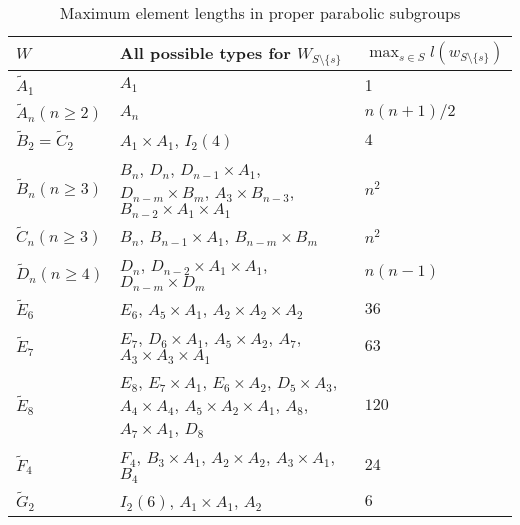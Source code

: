 \begin{table}[ht]
	\centering
	\begin{tabular}{l|p{7cm}|l}
		$W$ & All possible types for $W_{S \setminus \{s\}}$ & $\max_{s \in S} l(w_{S \setminus \{s\}})$ \\
		\hline
		$\tilde A_1$ & $A_1$ & 1 \\
		$\tilde A_n (n \geq 2)$ & $A_n$ & $n(n+1)/2$ \\
		$\tilde B_2 = \tilde C_2$ & $A_1 \times A_1$, $I_2(4)$ & $4$ \\
		$\tilde B_n (n \geq 3)$ & $B_n$, $D_n$, $D_{n-1} \times A_1$, $D_{n-m} \times B_m$, $A_3 \times B_{n-3}$, $B_{n-2} \times A_1 \times A_1$ & $n^2$ \\
		$\tilde C_n (n \geq 3)$ & $B_n$, $B_{n-1} \times A_1$, $B_{n-m} \times B_m$ & $n^2$ \\
		$\tilde D_n (n \geq 4)$ & $D_n$, $D_{n-2} \times A_1 \times A_1$, $D_{n-m} \times D_m$ & $n(n-1)$ \\
		$\tilde E_6$ & $E_6$, $A_5 \times A_1$, $A_2 \times A_2 \times A_2$ & $36$ \\
		$\tilde E_7$ & $E_7$, $D_6 \times A_1$, $A_5 \times A_2$, $A_7$, $A_3 \times A_3 \times A_1$ & $63$ \\
		$\tilde E_8$ & $E_8$, $E_7 \times A_1$, $E_6 \times A_2$, $D_5 \times A_3$, $A_4 \times A_4$, $A_5 \times A_2 \times A_1$, $A_8$, $A_7 \times A_1$, $D_8$ & $120$ \\
		$\tilde F_4$ & $F_4$, $B_3 \times A_1$, $A_2 \times A_2$, $A_3 \times A_1$, $B_4$ & $24$ \\
		$\tilde G_2$ & $I_2(6)$, $A_1 \times A_1$, $A_2$ & $6$ \\
	\end{tabular}
	\caption{Maximum element lengths in proper parabolic subgroups}
	\label{tab:parabolic-max-length}	
\end{table}

